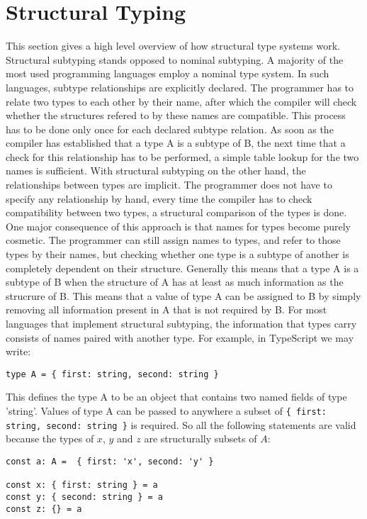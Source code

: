 \section{Structural Typing}
This section gives a high level overview of how structural type systems work.
Structural subtyping stands opposed to nominal subtyping. 
A majority of the most used programming languages employ a nominal type system.
In such languages, subtype relationships are explicitly declared.
The programmer has to relate two types to each other by their name,
after which the compiler will check whether the structures refered to by these names are compatible.
This process has to be done only once for each declared subtype relation.
As soon as the compiler has established that a type A is a subtype of B,
the next time that a check for this relationship has to be performed, 
a simple table lookup for the two names is sufficient.
\bigskip
With structural subtyping on the other hand, the relationships between types are implicit.
The programmer does not have to specify any relationship by hand,
every time the compiler has to check compatibility between two types, a structural comparison of the types is done.
One major consequence of this approach is that names for types become purely cosmetic.
The programmer can still assign names to types, and refer to those types by their names,
but checking whether one type is a subtype of another is completely dependent on their structure.
Generally this means that a type A is a subtype of B when the structure of A has at least as much information as the strucrure of B.
This means that a value of type A can be assigned to B by simply removing all information present in A that is not required by B.
For most languages that implement structural subtyping, the information that types carry consists of names paired with another type.
For example, in TypeScript we may write:

\begin{lstlisting}
type A = { first: string, second: string }
\end{lstlisting}

This defines the type A to be an object that contains two named fields of type 'string'.
Values of type A can be passed to anywhere a subset of \texttt{\{ first: string, second: string \}} is required.
So all the following statements are valid because the types of $x$, $y$ and $z$ are structurally subsets of $A$:

\begin{lstlisting}
const a: A =  { first: 'x', second: 'y' }

const x: { first: string } = a
const y: { second: string } = a
const z: {} = a
\end{lstlisting}

